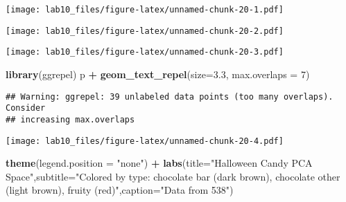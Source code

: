 \documentclass[
]{article}
\newenvironment{Shaded}{\begin{snugshade}}{\end{snugshade}}
\newcommand{\DataTypeTok}[1]{\textcolor[rgb]{0.13,0.29,0.53}{#1}}
\newcommand{\DecValTok}[1]{\textcolor[rgb]{0.00,0.00,0.81}{#1}}
\newcommand{\FloatTok}[1]{\textcolor[rgb]{0.00,0.00,0.81}{#1}}
\newcommand{\KeywordTok}[1]{\textcolor[rgb]{0.13,0.29,0.53}{\textbf{#1}}}
\newcommand{\NormalTok}[1]{#1}
\newcommand{\OperatorTok}[1]{\textcolor[rgb]{0.81,0.36,0.00}{\textbf{#1}}}
\newcommand{\StringTok}[1]{\textcolor[rgb]{0.31,0.60,0.02}{#1}}
\begin{document}
\texttt{[image: lab10\_files/figure-latex/unnamed-chunk-20-1.pdf]}

\begin{Shaded}
\end{Shaded}

\texttt{[image: lab10\_files/figure-latex/unnamed-chunk-20-2.pdf]}

\begin{Shaded}
\end{Shaded}

\texttt{[image: lab10\_files/figure-latex/unnamed-chunk-20-3.pdf]}

\begin{Shaded}
\begin{Highlighting}[]
\KeywordTok{library}\NormalTok{(ggrepel)}
\NormalTok{p }\OperatorTok{+}\StringTok{ }\KeywordTok{geom_text_repel}\NormalTok{(}\DataTypeTok{size=}\FloatTok{3.3}\NormalTok{, }\DataTypeTok{max.overlaps =} \DecValTok{7}\NormalTok{)}
\end{Highlighting}
\end{Shaded}

\begin{verbatim}
## Warning: ggrepel: 39 unlabeled data points (too many overlaps). Consider
## increasing max.overlaps
\end{verbatim}

\texttt{[image: lab10\_files/figure-latex/unnamed-chunk-20-4.pdf]}

\begin{Shaded}
\begin{Highlighting}[]
\KeywordTok{theme}\NormalTok{(}\DataTypeTok{legend.position =} \StringTok{"none"}\NormalTok{) }\OperatorTok{+}\StringTok{ }\KeywordTok{labs}\NormalTok{(}\DataTypeTok{title=}\StringTok{"Halloween Candy PCA Space"}\NormalTok{,}\DataTypeTok{subtitle=}\StringTok{"Colored by type: chocolate bar (dark brown), chocolate other (light brown), fruity (red)"}\NormalTok{,}\DataTypeTok{caption=}\StringTok{"Data from 538"}\NormalTok{)}
\end{Highlighting}
\end{Shaded}
\end{document}
